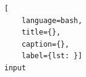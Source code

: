 \begin{lstlisting}[
    language=bash,
    title={}, 
    caption={}, 
    label={lst: }]
input
\end{lstlisting}